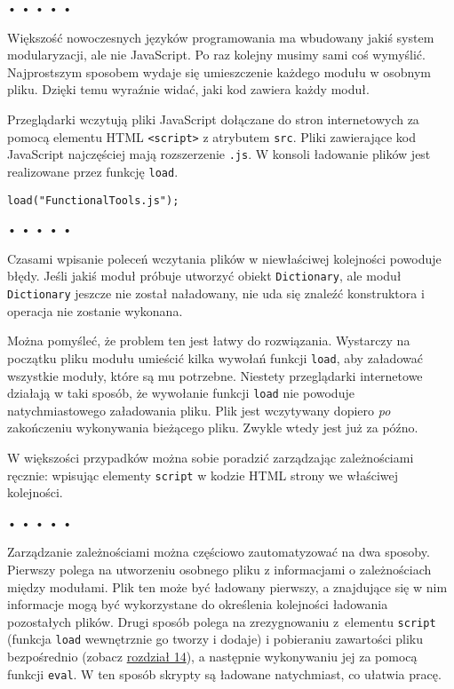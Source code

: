\begin{center}
• • • • •
\end{center}

  
Większość nowoczesnych języków programowania ma wbudowany jakiś system modularyzacji, ale nie JavaScript. Po raz kolejny musimy sami coś wymyślić. Najprostszym sposobem wydaje się umieszczenie każdego modułu w osobnym pliku. Dzięki temu wyraźnie widać, jaki kod zawiera każdy moduł.

  
Przeglądarki wczytują pliki JavaScript dołączane do stron internetowych za pomocą elementu HTML \texttt{<script>} z atrybutem \texttt{src}. Pliki zawierające kod JavaScript najczęściej mają rozszerzenie \texttt{.js}. W konsoli ładowanie plików jest realizowane przez funkcję \texttt{load}.

  
\begin{verbatim} 
load("FunctionalTools.js");
 \end{verbatim}


\begin{center}
• • • • •
\end{center}

  
Czasami wpisanie poleceń wczytania plików w niewłaściwej kolejności powoduje błędy. Jeśli jakiś moduł próbuje utworzyć obiekt \texttt{Dictionary}, ale moduł \texttt{Dictionary} jeszcze nie został naładowany, nie uda się znaleźć konstruktora i operacja nie zostanie wykonana.

  
Można pomyśleć, że problem ten jest łatwy do rozwiązania. Wystarczy na początku pliku modułu umieścić kilka wywołań funkcji \texttt{load}, aby załadować wszystkie moduły, które są mu potrzebne. Niestety przeglądarki internetowe działają w taki sposób, że wywołanie funkcji \texttt{load} nie powoduje natychmiastowego załadowania pliku. Plik jest wczytywany dopiero \emph{po} zakończeniu wykonywania bieżącego pliku. Zwykle wtedy jest już za późno.

  
W większości przypadków można sobie poradzić zarządzając zależnościami ręcznie: wpisując elementy \texttt{script} w kodzie HTML strony we właściwej kolejności.



\begin{center}
• • • • •
\end{center}

  
Zarządzanie zależnościami można częściowo zautomatyzować na dwa sposoby. Pierwszy polega na utworzeniu osobnego pliku z informacjami o zależnościach między modułami. Plik ten może być ładowany pierwszy, a znajdujące się w nim informacje mogą być wykorzystane do określenia kolejności ładowania pozostałych plików. Drugi sposób polega na zrezygnowaniu z~elementu \texttt{script} (funkcja \texttt{load} wewnętrznie go tworzy i dodaje) i pobieraniu zawartości pliku bezpośrednio (zobacz \hyperref[chap:14]{rozdział 14}), a następnie wykonywaniu jej za pomocą funkcji \texttt{eval}. W ten sposób skrypty są ładowane natychmiast, co ułatwia pracę.


